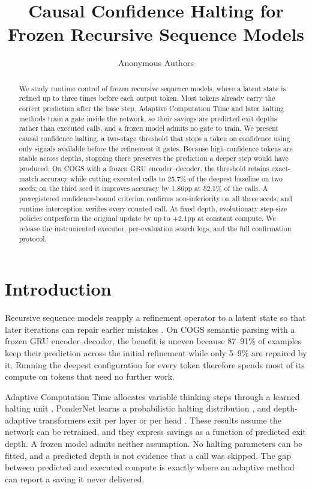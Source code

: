 ﻿\documentclass[11pt]{article}
\title{Causal Confidence Halting for Frozen Recursive Sequence Models}
\author{Anonymous Authors}
\begin{document}
\maketitle

\begin{abstract}
We study runtime control of frozen recursive sequence models, where a latent state is refined up to three times before each output token. Most tokens already carry the correct prediction after the base step. Adaptive Computation Time and later halting methods train a gate inside the network, so their savings are predicted exit depths rather than executed calls, and a frozen model admits no gate to train. We present causal confidence halting, a two-stage threshold that stops a token on confidence using only signals available before the refinement it gates. Because high-confidence tokens are stable across depths, stopping there preserves the prediction a deeper step would have produced. On COGS with a frozen GRU encoder--decoder, the threshold retains exact-match accuracy while cutting executed calls to 25.7\% of the deepest baseline on two seeds; on the third seed it improves accuracy by 1.86pp at 52.1\% of the calls. A preregistered confidence-bound criterion confirms non-inferiority on all three seeds, and runtime interception verifies every counted call. At fixed depth, evolutionary step-size policies outperform the original update by up to $+2.1$pp at constant compute. We release the instrumented executor, per-evaluation search logs, and the full confirmation protocol.
\end{abstract}

\section{Introduction}
\label{sec:intro}

Recursive sequence models reapply a refinement operator to a latent state so that later iterations can repair earlier mistakes \citep{graves2016adaptive,dehghani2019universal}. On COGS semantic parsing \citep{kim2020cogs} with a frozen GRU encoder--decoder, the benefit is uneven because 87--91\% of examples keep their prediction across the initial refinement while only 5--9\% are repaired by it. Running the deepest configuration for every token therefore spends most of its compute on tokens that need no further work.

Adaptive Computation Time allocates variable thinking steps through a learned halting unit \citep{graves2016adaptive}, PonderNet learns a probabilistic halting distribution \citep{banino2021ponder}, and depth-adaptive transformers exit per layer or per head \citep{elbayad2020depth,schuster2022calm}. These results assume the network can be retrained, and they express savings as a function of predicted exit depth. A frozen model admits neither assumption. No halting parameters can be fitted, and a predicted depth is not evidence that a call was skipped. The gap between predicted and executed compute is exactly where an adaptive method can report a saving it never delivered.
\end{document}
